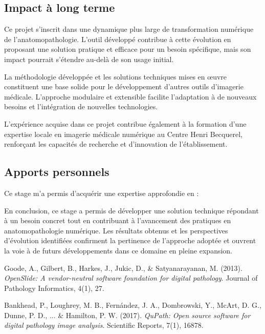 \documentclass[12pt,a4paper]{report}
\begin{document}
\begin{}
\begin{}
\begin{}
\begin{}
\subsection{Impact à long terme}

Ce projet s'inscrit dans une dynamique plus large de transformation numérique de l'anatomopathologie. L'outil développé contribue à cette évolution en proposant une solution pratique et efficace pour un besoin spécifique, mais son impact pourrait s'étendre au-delà de son usage initial.

La méthodologie développée et les solutions techniques mises en œuvre constituent une base solide pour le développement d'autres outils d'imagerie médicale. L'approche modulaire et extensible facilite l'adaptation à de nouveaux besoins et l'intégration de nouvelles technologies.

L'expérience acquise dans ce projet contribue également à la formation d'une expertise locale en imagerie médicale numérique au Centre Henri Becquerel, renforçant les capacités de recherche et d'innovation de l'établissement.

\subsection{Apports personnels}

\begin{center}
Ce stage m'a permis d'acquérir une expertise approfondie en :
\end{center}

\vspace{0.5em}

En conclusion, ce stage a permis de développer une solution technique répondant à un besoin concret tout en contribuant à l'avancement des pratiques en anatomopathologie numérique. Les résultats obtenus et les perspectives d'évolution identifiées confirment la pertinence de l'approche adoptée et ouvrent la voie à de futurs développements dans ce domaine en pleine expansion.

\begin{thebibliography}{20}

Goode, A., Gilbert, B., Harkes, J., Jukic, D., \& Satyanarayanan, M. (2013). 
\textit{OpenSlide: A vendor-neutral software foundation for digital pathology}. 
Journal of Pathology Informatics, 4(1), 27.

Bankhead, P., Loughrey, M. B., Fernández, J. A., Dombrowski, Y., McArt, D. G., Dunne, P. D., ... \& Hamilton, P. W. (2017). 
\textit{QuPath: Open source software for digital pathology image analysis}. 
Scientific Reports, 7(1), 16878.


\end{thebibliography}
\end{}
\end{}
\end{}
\end{}
\end{document}
